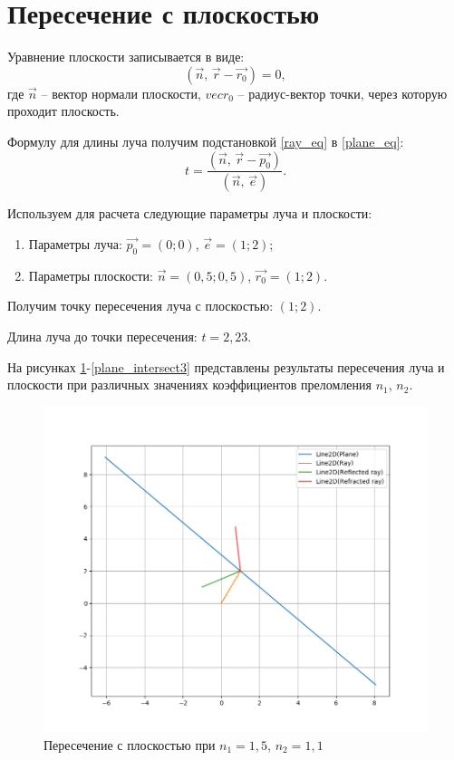 \section{Пересечение с плоскостью}
{
	Уравнение плоскости записывается в виде:
	\begin{equation}\label{plane_eq}
	(\vec{n},\, \vec{r} - \vec{r_0}) = 0,
	\end{equation}
	где $\vec{n}$ -- вектор нормали плоскости, 
	\newline $vec{r_0}$ -- радиус-вектор точки, через которую проходит плоскость.
	
	Формулу для длины луча получим подстановкой \eqref{ray_eq} в \eqref{plane_eq}:
	\begin{equation}\label{ray_plane_distance}
	t = \frac{(\vec{n},\, \vec{r} - \vec{p_0})}{(\vec{n},\, \vec{e})}.
	\end{equation}
	
	Используем для расчета следующие параметры луча и плоскости:
	\begin{enumerate}
	\item Параметры луча: $\vec{p_0} = (0; 0)$, $\vec{e} = (1; 2)$;
	\item Параметры плоскости: $\vec{n} = (0,5; 0,5)$, $\vec{r_0} = (1; 2)$.
	\end{enumerate}
	
	Получим точку пересечения луча с плоскостью: $(1; 2)$.
	
	Длина луча до точки пересечения: $t = 2,23$.
	
	На рисунках \ref{plane_intersect1}-\ref{plane_intersect3} представлены результаты пересечения луча и плоскости при различных значениях коэффициентов преломления $n_1$, $n_2$.

	\begin{figure}[H]
		\centering
		\includegraphics[width=0.65\pagewidth]{plane_intersect1}
		\caption{Пересечение с плоскостью при $n_1 = 1,5$, $n_2 = 1,1$}
		\label{plane_intersect1}
	\end{figure}
	
}
